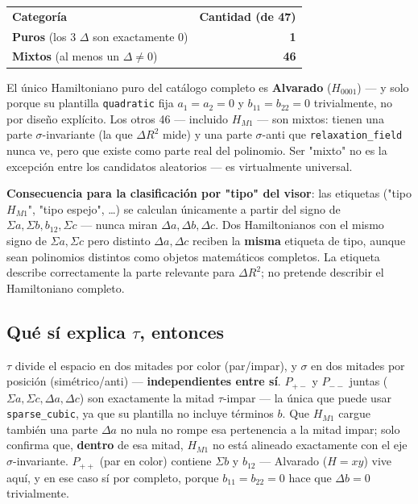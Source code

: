 \documentclass[11pt, a4paper]{article}
\newcommand{\TH}[1]{\cellcolor{cTHbg}\color{white}\textbf{#1}}
\newcommand{\good}[1]{\color{cGood}\textbf{#1}}
\newcommand{\bad}[1]{\color{cBad}\textbf{#1}}
\begin{document}
\medskip
\begin{center}
\begin{tabular}{lr}
  \TH{Categor\'ia} & \TH{Cantidad (de 47)} \\[1pt]
  \good{Puros} (los 3 $\Delta$ son exactamente 0) & \good{1} \\
  \bad{Mixtos} (al menos un $\Delta\neq0$) & \bad{46} \\
\end{tabular}
\end{center}
\medskip

\begin{tcolorbox}[quotebox]
  El \'unico Hamiltoniano puro del cat\'alogo completo es
  \textbf{Alvarado} ($H_{0001}$) --- y solo porque su plantilla
  \texttt{quadratic} fija $a_1=a_2=0$ y $b_{11}=b_{22}=0$
  trivialmente, no por dise\~no expl\'icito. Los otros 46 --- incluido
  $H_{M1}$ --- son mixtos: tienen una parte $\sigma$-invariante (la que
  $\Delta R^2$ mide) y una parte $\sigma$-anti que \texttt{relaxation\_field}
  nunca ve, pero que existe como parte real del polinomio. Ser
  "mixto" no es la excepci\'on entre los candidatos aleatorios --- es
  virtualmente universal.
\end{tcolorbox}

\textbf{Consecuencia para la clasificaci\'on por "tipo" del visor}: las
etiquetas ("tipo $H_{M1}$", "tipo espejo", \ldots) se calculan
\'unicamente a partir del signo de $\Sigma a,\Sigma b,b_{12},\Sigma c$
--- nunca miran $\Delta a,\Delta b,\Delta c$. Dos Hamiltonianos con el
mismo signo de $\Sigma a,\Sigma c$ pero distinto $\Delta a,\Delta c$
reciben la \textbf{misma} etiqueta de tipo, aunque sean polinomios
distintos como objetos matem\'aticos completos. La etiqueta describe
correctamente la parte relevante para $\Delta R^2$; no pretende
describir el Hamiltoniano completo.

\subsection{Qu\'e s\'i explica $\tau$, entonces}

$\tau$ divide el espacio en dos mitades por color (par/impar), y
$\sigma$ en dos mitades por posici\'on (sim\'etrico/anti) ---
\textbf{independientes entre s\'i}. $P_{+-}$ y $P_{--}$ juntas
($\Sigma a,\Sigma c,\Delta a,\Delta c$) son exactamente la mitad
$\tau$-impar --- la \'unica que puede usar \texttt{sparse\_cubic}, ya
que su plantilla no incluye t\'erminos $b$. Que $H_{M1}$ cargue
tambi\'en una parte $\Delta a$ no nula no rompe esa pertenencia a la
mitad impar; solo confirma que, \textbf{dentro} de esa mitad, $H_{M1}$
no est\'a alineado exactamente con el eje $\sigma$-invariante. $P_{++}$
(par en color) contiene $\Sigma b$ y $b_{12}$ --- Alvarado ($H=xy$)
vive aqu\'i, y en ese caso s\'i por completo, porque $b_{11}=b_{22}=0$
hace que $\Delta b=0$ trivialmente.
\end{document}
